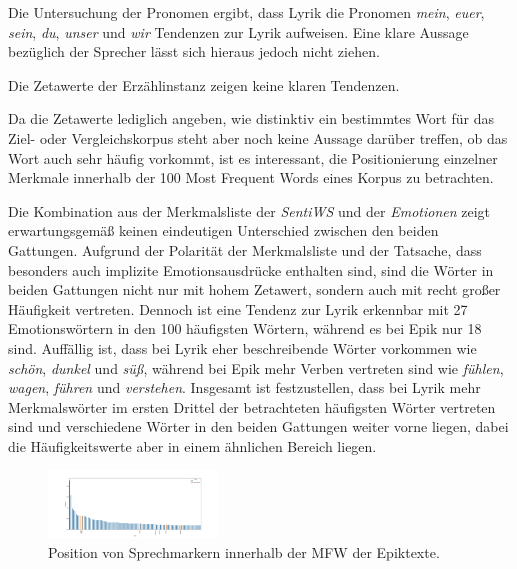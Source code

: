 \documentclass[a4paper,10p]{article}
\begin{document}
Die Untersuchung der Pronomen ergibt, dass Lyrik die Pronomen \textit{mein}, \textit{euer}, \textit{sein}, \textit{du}, \textit{unser} und \textit{wir} Tendenzen zur Lyrik aufweisen. Eine klare Aussage bezüglich der Sprecher lässt sich hieraus jedoch nicht ziehen. \par 

Die Zetawerte der Erzählinstanz zeigen keine klaren Tendenzen. \par

Da die Zetawerte lediglich angeben, wie distinktiv ein bestimmtes Wort für das Ziel- oder Vergleichskorpus steht aber noch keine Aussage darüber treffen, ob das Wort auch sehr häufig vorkommt, ist es interessant, die Positionierung einzelner Merkmale innerhalb der 100 Most Frequent Words eines Korpus zu betrachten.\par 

Die Kombination aus der Merkmalsliste der \textit{SentiWS} und der \textit{Emotionen} zeigt erwartungsgemäß keinen eindeutigen Unterschied zwischen den beiden Gattungen. Aufgrund der Polarität der Merkmalsliste und der Tatsache, dass besonders auch implizite Emotionsausdrücke enthalten sind, sind die Wörter in beiden Gattungen nicht nur mit hohem Zetawert, sondern auch mit recht großer Häufigkeit vertreten. Dennoch ist eine Tendenz zur Lyrik erkennbar mit 27 Emotionswörtern in den 100 häufigsten Wörtern, während es bei Epik nur 18 sind. Auffällig ist, dass bei Lyrik eher beschreibende Wörter vorkommen wie \textit{schön}, \textit{dunkel} und \textit{süß}, während bei Epik mehr Verben vertreten sind wie \textit{fühlen}, \textit{wagen}, \textit{führen} und \textit{verstehen}. Insgesamt ist festzustellen, dass bei Lyrik mehr Merkmalswörter im ersten Drittel der betrachteten häufigsten Wörter vertreten sind und verschiedene Wörter in den beiden Gattungen weiter vorne liegen, dabei die Häufigkeitswerte aber in einem ähnlichen Bereich liegen. \par 

\begin{figure}
	\includegraphics[width=0.4\textwidth]{haupt_epik_sprechmarker_mfw.png}
	\caption{Position von Sprechmarkern innerhalb der MFW der Epiktexte.}
	\label{fig:haupt_sprechmarker_in_mfw}
\end{figure}
\end{document}
